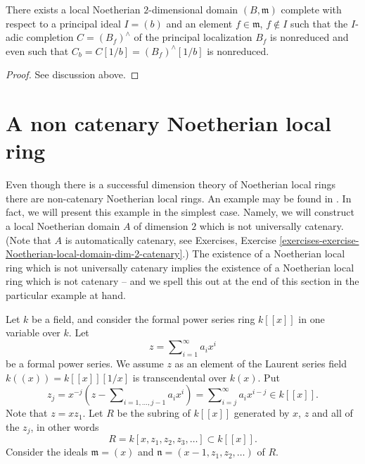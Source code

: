 \begin{lemma}
\label{lemma-nonreduced-recompletion}
There exists a local Noetherian $2$-dimensional domain $(B, \mathfrak m)$
complete with respect to a principal ideal $I = (b)$ and an
element $f \in \mathfrak m$, $f \not \in I$ such that
the $I$-adic completion $C = (B_f)^\wedge$ of the principal
localization $B_f$ is nonreduced and even such that
$C_b = C[1/b] = (B_f)^\wedge[1/b]$ is nonreduced.
\end{lemma}

\begin{proof}
See discussion above.
\end{proof}








\section{A non catenary Noetherian local ring}
\label{section-non-catenary-Noetherian-local}

\noindent
Even though there is a successful dimension theory of Noetherian local rings
there are non-catenary Noetherian local rings. An example may be found in
\cite[Appendix, Example 2]{Nagata}. In fact, we will present this example
in the simplest case. Namely, we will construct a local Noetherian domain $A$
of dimension $2$ which is not universally catenary. (Note that $A$ is
automatically catenary, see
Exercises, Exercise
\ref{exercises-exercise-Noetherian-local-domain-dim-2-catenary}.)
The existence of a Noetherian local ring which is not universally
catenary implies the existence of a Noetherian local ring which
is not catenary -- and we spell this out at the end of this section
in the particular example at hand.

\medskip\noindent
Let $k$ be a field, and consider the formal power series ring
$k[[x]]$ in one variable over $k$. Let
$$
z = \sum\nolimits_{i = 1}^\infty a_i x^i
$$
be a formal power series. We assume $z$ as an element of the Laurent
series field $k((x)) = k[[x]][1/x]$ is transcendental over $k(x)$.
Put
$$
z_j
=
x^{-j}(z - \sum\nolimits_{i = 1, \ldots, j - 1} a_i x^i)
=
\sum\nolimits_{i = j}^\infty a_i x^{i - j}
\in k[[x]].
$$
Note that $z = xz_1$.
Let $R$ be the subring of $k[[x]]$ generated by $x$, $z$ and all of the
$z_j$, in other words
$$
R = k[x, z_1, z_2, z_3, \ldots ] \subset k[[x]].
$$
Consider the ideals $\mathfrak m = (x)$ and
$\mathfrak n = (x - 1, z_1, z_2, \ldots)$ of $R$.

